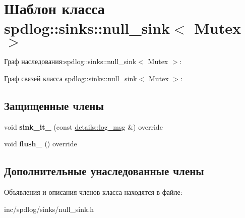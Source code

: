 \hypertarget{classspdlog_1_1sinks_1_1null__sink}{}\section{Шаблон класса spdlog\+:\+:sinks\+:\+:null\+\_\+sink$<$ Mutex $>$}
\label{classspdlog_1_1sinks_1_1null__sink}


Граф наследования\+:spdlog\+:\+:sinks\+:\+:null\+\_\+sink$<$ Mutex $>$\+:


Граф связей класса spdlog\+:\+:sinks\+:\+:null\+\_\+sink$<$ Mutex $>$\+:
\subsection*{Защищенные члены}
\begin{DoxyCompactItemize}
\item 
\mbox{\label{classspdlog_1_1sinks_1_1null__sink_a158c702167f6a46609de2c561f82973c}} 
void {\bfseries sink\+\_\+it\+\_\+} (const \hyperlink{structspdlog_1_1details_1_1log__msg}{details\+::log\+\_\+msg} \&) override
\item 
\mbox{\label{classspdlog_1_1sinks_1_1null__sink_a074c0d22167808789440953111a97926}} 
void {\bfseries flush\+\_\+} () override
\end{DoxyCompactItemize}
\subsection*{Дополнительные унаследованные члены}


Объявления и описания членов класса находятся в файле\+:\begin{DoxyCompactItemize}
\item 
inc/spdlog/sinks/null\+\_\+sink.\+h\end{DoxyCompactItemize}
